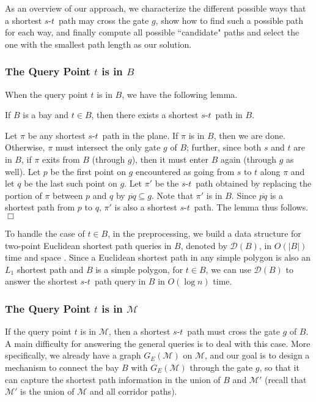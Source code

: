 \documentclass[english,runningheads,11pt]{llncs}
\def\calM{\mathcal{M}}
\def\calD{\mathcal{D}}
\def\st{$s$-$t$}
\newenvironment{proof}{\noindent {\textbf{Proof:}}\rm}{\hfill $\Box$\rm}
\begin{document}
As an overview of our approach, we characterize the different possible ways that a
shortest \st\ path may cross the gate $g$, show how to find
such a possible path for each way, and finally compute all possible ``candidate"
paths and select the one with the smallest path length as our solution.

\subsubsection{The Query Point $t$ is in $B$}

When the query point $t$ is in $B$, we have the following lemma.

\begin{lemma}\label{lem:90}
If $B$ is a bay and $t\in B$, then there exists a shortest \st\ path in $B$.
\end{lemma}
\begin{proof}
Let $\pi$ be any shortest \st\ path in the plane. If $\pi$ is in $B$, then we are
done. Otherwise, $\pi$ must intersect the only gate $g$ of $B$; further, since both $s$ and
$t$ are in $B$, if $\pi$ exits from $B$ (through $g$), then it must enter $B$ again
(through $g$ as well).  Let $p$ be the first point on $g$ encountered as
going from $s$ to $t$ along $\pi$ and let $q$ be the last such
point on $g$. Let $\pi'$ be the \st\ path obtained by replacing the portion of $\pi$
between $p$ and $q$ by $\overline{pq}\subseteq g$. Note that $\pi'$ is in $B$.
Since $\overline{pq}$ is a
shortest path from $p$ to $q$, $\pi'$ is also a shortest \st\ path.
The lemma thus follows.
\end{proof}

To handle the case of $t\in B$, in the preprocessing,
we build a data structure for two-point Euclidean shortest path queries
in $B$, denoted by $\calD(B)$,
in $O(|B|)$ time and space \cite{ref:GuibasOp89}.
Since a Euclidean shortest path in any simple polygon is also an $L_1$
shortest path and $B$ is a simple polygon, for $t\in B$, we can use $\calD(B)$ to
answer the shortest \st\ path query in $B$ in $O(\log n)$ time.


\subsubsection{The Query Point $t$ is in $\calM$}

If the query point $t$ is in $\calM$, then a shortest \st\ path must cross the gate $g$ of
$B$. A main difficulty for answering the general queries is to deal with this case.
More specifically, we already have a graph $G_E(\calM)$ on $\calM$,
and our goal is to design a mechanism to connect the bay $B$ with
$G_E(\calM)$ through the gate $g$, so that it can
capture the shortest path information in the union of $B$ and $\calM'$ (recall that $\calM'$ is the union of $\calM$ and all corridor paths).
\end{document}
